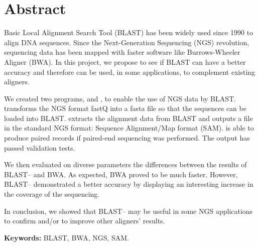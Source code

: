 \chapter*{Abstract}

Basic Local Alignment Search Tool (BLAST) has been widely used since 1990 to align DNA sequences.
Since the Next-Generation Sequencing (NGS) revolution, sequencing data has been mapped with faster software like Burrows-Wheeler Aligner (BWA).
In this project, we propose to see if BLAST can have a better accuracy and therefore can be used, in some applications, to complement existing aligners.

We created two programs, \fastqtofasta{} and \blastobam{}, to enable the use of NGS data by BLAST.
\fastqtofasta{} transforms the NGS format fastQ into a fasta file so that the sequences can be loaded into BLAST.
\blastobam{} extracts the alignment data from BLAST and outputs a file in the standard NGS format: Sequence Alignment\slash\hspace{0pt}Map format (SAM).
\blastobam{} is able to produce paired records if paired-end sequencing was performed.
The output has passed validation tests.

We then evaluated on diverse parameters the differences between the results of BLAST--\blastobam{} and BWA.
As expected, BWA proved to be much faster.
However, BLAST--\blastobam{} demonstrated a better accuracy by displaying an interesting increase in the coverage of the sequencing.

In conclusion, we showed that BLAST--\blastobam{} may be useful in some NGS applications to confirm and\slash\hspace{0pt}or to improve other aligners' results.
\bigskip

\textbf{Keywords:} BLAST, BWA, NGS, SAM.
